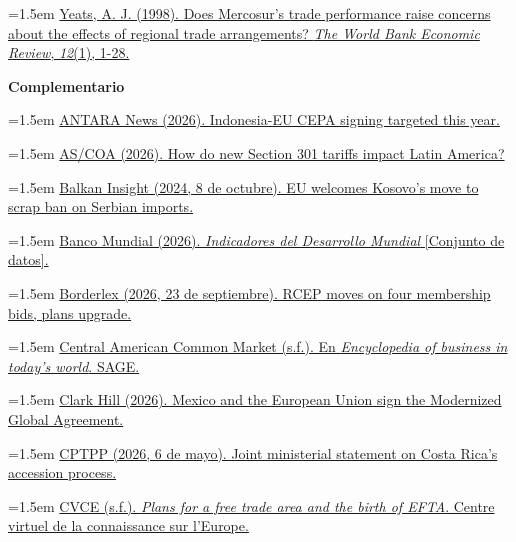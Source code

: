 \documentclass[10pt,a4paper]{article}
\begin{document}
\noindent\hangindent=1.5em \href{https://ideas.repec.org/a/oup/wbecrv/v12y1998i1p1-28.html}{Yeats, A. J. (1998). Does Mercosur's trade performance raise concerns about the effects of regional trade arrangements? \textit{The World Bank Economic Review}, \textit{12}(1), 1-28.}

\textbf{Complementario}

\noindent\hangindent=1.5em \href{https://en.antaranews.com/news/434038/indonesia-eu-cepa-signing-targeted-this-year-minister-hartarto}{ANTARA News (2026). Indonesia-EU CEPA signing targeted this year.}

\noindent\hangindent=1.5em \href{https://www.as-coa.org/articles/how-do-new-section-301-tariffs-impact-latin-america}{AS/COA (2026). How do new Section 301 tariffs impact Latin America?}

\noindent\hangindent=1.5em \href{https://balkaninsight.com/2024/10/08/eu-welcomes-kosovos-move-to-scrap-ban-on-serbian-imports/}{Balkan Insight (2024, 8 de octubre). EU welcomes Kosovo's move to scrap ban on Serbian imports.}

\noindent\hangindent=1.5em \href{https://data.worldbank.org}{Banco Mundial (2026). \textit{Indicadores del Desarrollo Mundial} [Conjunto de datos].}

\noindent\hangindent=1.5em \href{https://borderlex.net/2026/09/23/rcep-moves-on-four-membership-bids-plans-upgrade/}{Borderlex (2026, 23 de septiembre). RCEP moves on four membership bids, plans upgrade.}

\noindent\hangindent=1.5em \href{https://sk.sagepub.com/ency/edvol/embed/businesstoday/chpt/central-american-common-market}{Central American Common Market (s.f.). En \textit{Encyclopedia of business in today's world}. SAGE.}

\noindent\hangindent=1.5em \href{https://clarkhill.com/news-events/news/mexico-and-the-european-union-sign-the-modernized-global-agreement-opportunities-for-trade-investment-and-nearshoring/}{Clark Hill (2026). Mexico and the European Union sign the Modernized Global Agreement.}

\noindent\hangindent=1.5em \href{https://www.gov.uk/government/publications/conclusion-of-costa-ricas-cptpp-accession-working-group/joint-ministerial-statement-on-costa-ricas-accession-process-to-the-cptpp-6-may-2026}{CPTPP (2026, 6 de mayo). Joint ministerial statement on Costa Rica's accession process.}

\noindent\hangindent=1.5em \href{https://www.cvce.eu/content/publication/1997/10/13/24be7640-f29c-41ba-8a2d-59d608ab1cc0/publishable_en.pdf}{CVCE (s.f.). \textit{Plans for a free trade area and the birth of EFTA}. Centre virtuel de la connaissance sur l'Europe.}
\end{document}
